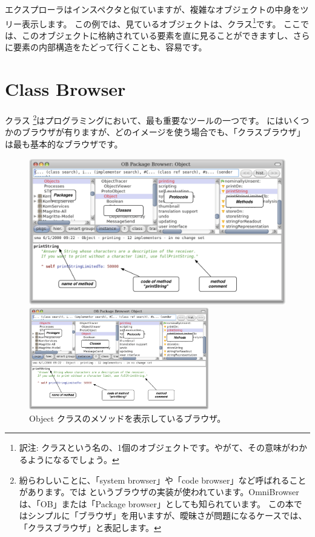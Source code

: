 \documentclass[a4paper,10pt,twoside]{book}
\begin{document}
エクスプローラはインスペクタと似ていますが、複雑なオブジェクトの中身をツリー表示します。
この例では、見ているオブジェクトは、クラス\footnote{訳注: クラスという名の、1個のオブジェクトです。やがて、その意味がわかるようになるでしょう。}です。
ここでは、このオブジェクトに格納されている要素を直に見ることができますし、さらに要素の内部構造をたどって行くことも、容易です。

\section{Class Browser}

クラス \footnote{紛らわしいことに、「system browser」や「code browser」など呼ばれることがあります。\pharo では というブラウザの実装が使われています。OmniBrowserは、「OB」または「Package browser」としても知られています。
この本ではシンプルに「ブラウザ」を用いますが、曖昧さが問題になるケースでは、「クラスブラウザ」と表記します。}はプログラミングにおいて、最も重要なツールの一つです。
\pharo にはいくつかのブラウザが有りますが、どのイメージを使う場合でも、「クラスブラウザ」は最も基本的なブラウザです。


\begin{figure}[htb]
\ifluluelse
	{\centerline {\includegraphics[width=\textwidth]{ClassBrowser1}}}
	{\centerline {\includegraphics[width=0.7\textwidth]{ClassBrowser1}}}
\caption{Object クラスのメソッドを表示しているブラウザ。
}
\end{figure}
\end{document}

